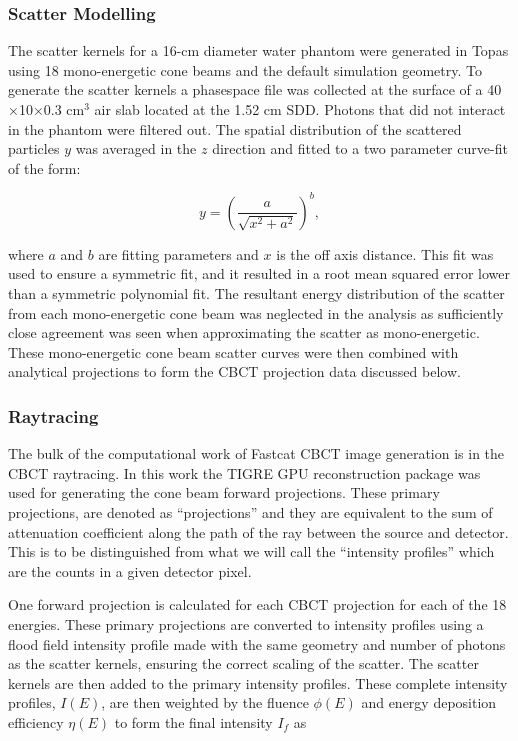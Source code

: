  \subsubsection{Scatter Modelling \label{sec:scat}}

The scatter kernels for a 16-cm diameter water phantom were generated in Topas using 18 mono-energetic cone beams and the default simulation geometry. To generate the scatter kernels a phasespace file was collected at the surface of a 40$\times$10$\times$0.3 cm$^3$ air slab located at the 1.52 cm SDD. Photons that did not interact in the phantom were filtered out. The spatial distribution of the scattered particles $y$ was averaged in the $z$ direction and fitted to a two parameter curve-fit of the form:

\begin{equation}
    y = (\frac{a}{\sqrt{x^2 + a^2}})^b,
\end{equation}

where $a$ and $b$ are fitting parameters and $x$ is the off axis distance. This fit was used to ensure a symmetric fit, and it resulted in a root mean squared error lower than a symmetric polynomial fit. The resultant energy distribution of the scatter from each mono-energetic cone beam was neglected in the analysis as sufficiently close agreement was seen when approximating the scatter as mono-energetic. These mono-energetic cone beam scatter curves were then combined with analytical projections to form the CBCT projection data discussed below.

\subsubsection{Raytracing}

The bulk of the computational work of Fastcat CBCT image generation is in the CBCT raytracing. In this work the TIGRE \cite{Biguri2016TIGRE:Reconstruction} GPU reconstruction package was used for generating the cone beam forward projections. These primary projections, are denoted as “projections” and they are equivalent to the sum of attenuation coefficient along the path of the ray between the source and detector. This is to be distinguished from what we will call the “intensity profiles” which are the counts in a given detector pixel. 

One forward projection is calculated for each CBCT projection for each of the 18 energies. These primary projections are converted to intensity profiles using a flood field intensity profile made with the same geometry and number of photons as the scatter kernels, ensuring the correct scaling of the scatter. The scatter kernels are then added to the primary intensity profiles. These complete intensity profiles, $I(E)$, are then weighted by the fluence $\phi(E)$ and energy deposition efficiency $\eta(E)$ to form the final intensity $I_f$ as

